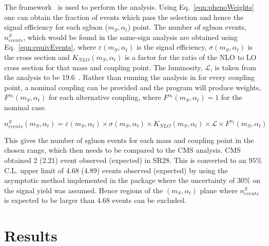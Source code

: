 The \MADAN framework~\cite{Conte2013222} is used to perform the analysis. Using Eq.~\ref{eqn:phenoWeights} one can obtain the fraction of events which pass the selection and hence the signal efficiency for each sgluon ($m_{S},\alpha_{t}$) point. The number of sgluon events, $n^{S}_{events}$, which would be found in the same-sign analysis are obtained using Eq.~\ref{eqn:equivEvents}, where $\varepsilon\left(m_{S},\alpha_{t}\right)$ is the signal efficiency, $\sigma\left(m_{S},\alpha_{t}\right)$ is the cross section and $K_{NLO}\left(m_{S},\alpha_{t}\right)$ is a factor for the ratio of the NLO to LO cross section for that mass and coupling point. The luminosity, $\mathcal{L}$, is taken from the analysis to be 19.6~\fbinv. Rather than running the analysis in \MADAN for every coupling point, a nominal coupling can be provided and the program will produce weights, $F^{\alpha_{t}}\left(m_{S},\alpha_{t}\right)$ for each alternative coupling, where $F^{\alpha_{t}}\left(m_{S},\alpha_{t}\right) = 1$ for the nominal case.

\begin{equation}
n^{S}_{events}\left(m_{S},\alpha_{t}\right) = \varepsilon\left(m_{S},\alpha_{t}\right)\times \sigma\left(m_{S},\alpha_{t}\right) \times K_{NLO}\left(m_{S},\alpha_{t}\right) \times \mathcal{L}\times F^{\alpha_{t}}\left(m_{S},\alpha_{t}\right)
\label{eqn:equivEvents}
\end{equation}

This gives the number of sgluon events for each mass and coupling point in the chosen range, which then needs to be compared to the CMS analysis. CMS obtained 2 (2.21) event observed (expected) in SR28. This is converted to an $95\%$ C.L. upper limit of 4.68 (4.89) events observed (expected) by using the asymptotic \CLS method implemented in the \ROOSTAT package where the uncertainty of $30\%$ on the signal yield was assumed. Hence regions of the $\left(m_{S},\alpha_{t}\right)$ plane where $n^{S}_{events}$ is expected to be larger than 4.68 events can be excluded.


\section{Results \label{sec:sgluonResults}}



